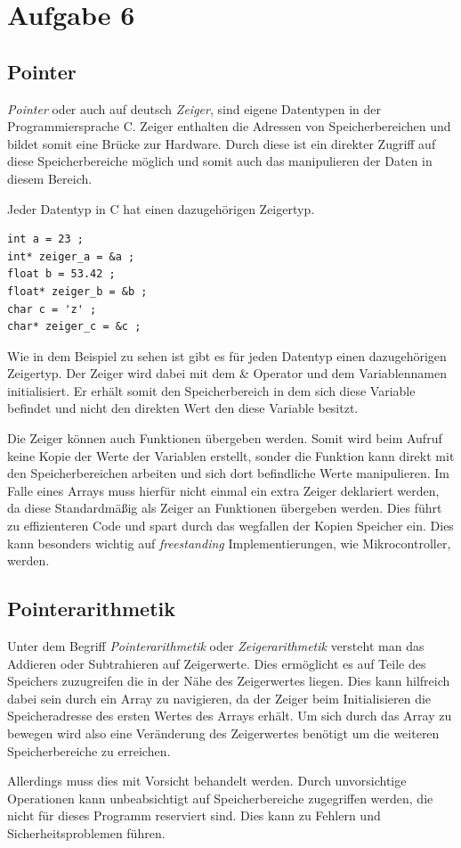 \chapter{Aufgabe 6}
\section{Pointer}
\textit{Pointer} oder auch auf deutsch \textit{Zeiger}, sind eigene Datentypen in der Programmiersprache C.
Zeiger enthalten die Adressen von Speicherbereichen und bildet somit eine Brücke zur Hardware.
Durch diese ist ein direkter Zugriff auf diese Speicherbereiche möglich und somit auch das manipulieren der Daten in diesem Bereich.\par
Jeder Datentyp in C hat einen dazugehörigen Zeigertyp\cite{boekelmann:2023}.\par

\begin{lstlisting}
int a = 23 ;
int* zeiger_a = &a ;
float b = 53.42 ;
float* zeiger_b = &b ;
char c = 'z' ;
char* zeiger_c = &c ;
\end{lstlisting}

Wie in dem Beispiel zu sehen ist gibt es für jeden Datentyp einen dazugehörigen Zeigertyp.
Der Zeiger wird dabei mit dem \& Operator und dem Variablennamen initialisiert.
Er erhält somit den Speicherbereich in dem sich diese Variable befindet und nicht den direkten Wert den diese Variable besitzt.\par
Die Zeiger können auch Funktionen übergeben werden.
Somit wird beim Aufruf keine Kopie der Werte der Variablen erstellt, sonder die Funktion kann direkt mit den Speicherbereichen arbeiten und sich dort befindliche Werte manipulieren.
Im Falle eines Arrays muss hierfür nicht einmal ein extra Zeiger deklariert werden, da diese Standardmäßig als Zeiger an Funktionen übergeben werden.
Dies führt zu effizienteren Code und spart durch das wegfallen der Kopien Speicher ein.
Dies kann besonders wichtig auf \textit{freestanding} Implementierungen, wie Mikrocontroller, werden.\cite{boekelmann:2023}\par

\section{Pointerarithmetik}
Unter dem Begriff \textit{Pointerarithmetik} oder \textit{Zeigerarithmetik} versteht man das Addieren oder Subtrahieren auf Zeigerwerte.
Dies ermöglicht es auf Teile des Speichers zuzugreifen die in der Nähe des Zeigerwertes liegen.
Dies kann hilfreich dabei sein durch ein Array zu navigieren, da der Zeiger beim Initialisieren die Speicheradresse des ersten Wertes des Arrays erhält.
Um sich durch das Array zu bewegen wird also eine Veränderung des Zeigerwertes benötigt um die weiteren Speicherbereiche zu erreichen.\par
Allerdings muss dies mit Vorsicht behandelt werden.
Durch unvorsichtige Operationen kann unbeabsichtigt auf Speicherbereiche zugegriffen werden, die nicht für dieses Programm reserviert sind.
Dies kann zu Fehlern und Sicherheitsproblemen führen\cite{boekelmann:2023}.\par

